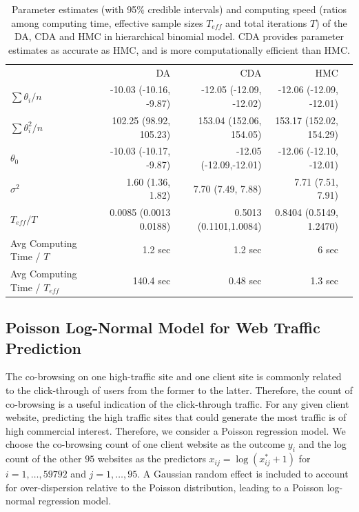 \documentclass[11pt]{article}
\begin{document}
 
\begin{table}[H]
\small
\centering
\begin{tabular}{|l |r |r| r| r |} 
 \hline
                          & DA & CDA & HMC\\
 [0.5ex]

 $ \sum \theta_i/n$      & -10.03 (-10.16, -9.87)& -12.05 (-12.09, -12.02) &  -12.06 (-12.09, -12.01)\\
 $ \sum \theta_i^2/n$      & 102.25 (98.92, 105.23)& 153.04 (152.06, 154.05) &  153.17 (152.02, 154.29)\\
$\theta_0$          & -10.03 (-10.17, -9.87)& -12.05 (-12.09,-12.01) &  -12.06 (-12.10, -12.01)\\
$\sigma^2$         & 1.60 (1.36, 1.82)&   7.70 (7.49, 7.88)  & 7.71 (7.51, 7.91)\\
$T_{eff} / T$ & 0.0085 (0.0013 0.0188) & 0.5013 (0.1101,1.0084) & 0.8404 (0.5149, 1.2470)\\
Avg Computing Time /  $T$  & 1.2 sec       & 1.2 sec        & 6 sec\\
Avg Computing Time /  $T_{eff}$  & 140.4 sec       & 0.48 sec        & 1.3 sec\\
 \hline
\end{tabular}
\caption{Parameter estimates (with 95\% credible intervals) and computing speed (ratios among computing time, effective sample sizes $T_{eff}$ and total iterations $T$) of the DA, CDA and HMC in hierarchical binomial model. CDA provides parameter estimates as accurate as HMC, and is more computationally efficient than HMC.}
\label{tab:binomial}
\end{table}


\subsection{Poisson Log-Normal Model for Web Traffic Prediction}

The co-browsing on one high-traffic site and one client site is commonly related to the click-through of users from the former to the latter. Therefore, the count of co-browsing is a useful indication of the click-through traffic. For any given client website, predicting the high traffic sites that could generate the most traffic is of high commercial interest. Therefore, we consider a Poisson regression model. We choose the co-browsing count of one client website as the outcome $y_i$ and the log count of the other $95$ websites as the predictors $x_{ij}=\log (x^*_{ij}+1)$ for $i=1,\ldots ,59792$ and $j=1,\ldots ,95$.  A Gaussian random effect is included to account for over-dispersion relative to the Poisson distribution, leading to a Poisson log-normal regression model. 
\end{document}
